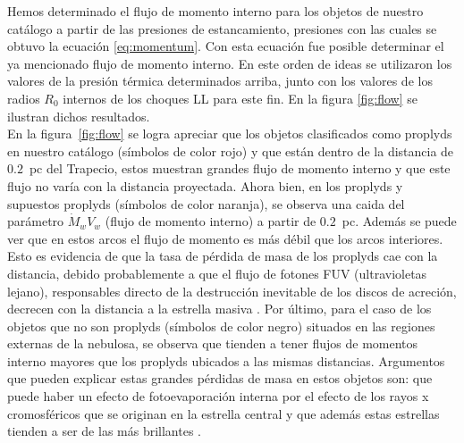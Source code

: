 Hemos determinado el flujo de momento interno para los objetos de nuestro catálogo a partir de las presiones de estancamiento, presiones con las cuales se obtuvo la ecuación \ref{eq:momentum}. Con esta ecuación fue posible determinar el ya mencionado flujo de momento interno. En este orden de ideas se utilizaron los valores de la presión térmica determinados arriba, junto con los valores de los radios \(R_{0}\) internos de los choques LL para este fin. En la figura \ref{fig:flow} se ilustran dichos resultados.\\

En la figura~\ref{fig:flow} se logra apreciar que los objetos clasificados como proplyds en nuestro catálogo (símbolos de color rojo) y que están dentro de la distancia de \(0.2\)~pc del Trapecio, estos muestran grandes flujo de momento interno y que este flujo no varía con la distancia proyectada. Ahora bien, en los proplyds y supuestos proplyds (símbolos de color naranja), se observa una caida del parámetro \(\dot{M}_{w}V_{w}\) (flujo de momento interno) a partir de \(0.2\)~pc. Además se puede ver que en estos arcos el flujo de momento es más débil que los arcos interiores. Esto es evidencia de que la tasa de pérdida de masa de los proplyds cae con la distancia, debido probablemente a que el flujo de fotones FUV (ultravioletas lejano), responsables directo de la destrucción inevitable de los discos de acreción, decrecen con la distancia a la estrella masiva \thC{}. Por último, para el caso de los objetos que no son proplyds (símbolos de color negro) situados en las regiones externas de la nebulosa, se observa que tienden a tener  flujos de momentos interno mayores que los proplyds ubicados a las mismas distancias. Argumentos que pueden explicar estas grandes pérdidas de masa en estos objetos son: que puede haber un efecto de fotoevaporación interna por el efecto de los rayos x cromosféricos que se originan en la estrella central y que además estas estrellas tienden a ser de las más brillantes \citep{Clarke:2014}.\\ 


%

%
